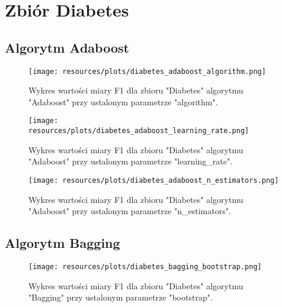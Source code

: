 \section{Zbiór Diabetes}
\subsection{Algorytm Adaboost}


\begin{figure}[H]
    \center
    \texttt{[image: resources/plots/diabetes\_adaboost\_algorithm.png]}
    \caption{Wykres wartości miary F1 dla zbioru "Diabetes" algorytmu "Adaboost" przy ustalonym parametrze "algorithm".}   
\end{figure}

\pagebreak
                    

\begin{figure}[H]
    \center
    \texttt{[image: resources/plots/diabetes\_adaboost\_learning\_rate.png]}
    \caption{Wykres wartości miary F1 dla zbioru "Diabetes" algorytmu "Adaboost" przy ustalonym parametrze "learning\_rate".}
\end{figure}

\pagebreak
                    

\begin{figure}[H]
    \center
    \texttt{[image: resources/plots/diabetes\_adaboost\_n\_estimators.png]}
    \caption{Wykres wartości miary F1 dla zbioru "Diabetes" algorytmu "Adaboost" przy ustalonym parametrze "n\_estimators".}
\end{figure}

\pagebreak
                    
\subsection{Algorytm Bagging}


\begin{figure}[H]
    \center
    \texttt{[image: resources/plots/diabetes\_bagging\_bootstrap.png]}
    \caption{Wykres wartości miary F1 dla zbioru "Diabetes" algorytmu "Bagging" przy ustalonym parametrze "bootstrap".}   
\end{figure}

